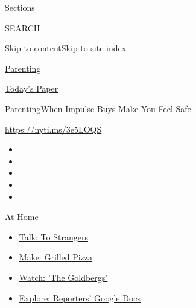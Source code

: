 Sections

SEARCH

\protect\hyperlink{site-content}{Skip to
content}\protect\hyperlink{site-index}{Skip to site index}

\href{https://www.nytimes3xbfgragh.onion/section/parenting}{Parenting}

\href{https://myaccount.nytimes3xbfgragh.onion/auth/login?response_type=cookie\&client_id=vi}{}

\href{https://www.nytimes3xbfgragh.onion/section/todayspaper}{Today's
Paper}

\href{/section/parenting}{Parenting}\textbar{}When Impulse Buys Make You
Feel Safe

\url{https://nyti.ms/3e5LOQS}

\begin{itemize}
\item
\item
\item
\item
\item
\end{itemize}

\href{https://www.nytimes3xbfgragh.onion/spotlight/at-home?action=click\&pgtype=Article\&state=default\&region=TOP_BANNER\&context=at_home_menu}{At
Home}

\begin{itemize}
\tightlist
\item
  \href{https://www.nytimes3xbfgragh.onion/2020/08/03/well/family/the-benefits-of-talking-to-strangers.html?action=click\&pgtype=Article\&state=default\&region=TOP_BANNER\&context=at_home_menu}{Talk:
  To Strangers}
\item
  \href{https://www.nytimes3xbfgragh.onion/2020/08/01/at-home/coronavirus-make-pizza-on-a-grill.html?action=click\&pgtype=Article\&state=default\&region=TOP_BANNER\&context=at_home_menu}{Make:
  Grilled Pizza}
\item
  \href{https://www.nytimes3xbfgragh.onion/2020/07/31/arts/television/goldbergs-abc-stream.html?action=click\&pgtype=Article\&state=default\&region=TOP_BANNER\&context=at_home_menu}{Watch:
  'The Goldbergs'}
\item
  \href{https://www.nytimes3xbfgragh.onion/interactive/2020/at-home/even-more-reporters-editors-diaries-lists-recommendations.html?action=click\&pgtype=Article\&state=default\&region=TOP_BANNER\&context=at_home_menu}{Explore:
  Reporters' Google Docs}
\end{itemize}

